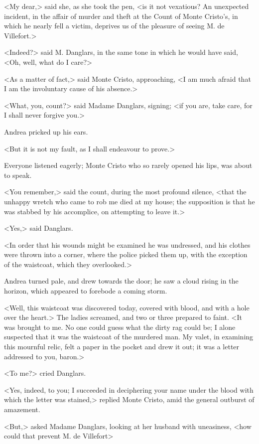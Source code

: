  <My dear,> said she, as she took the pen, <is it not vexatious? An unexpected incident, in the affair of murder and theft at the Count of Monte Cristo's, in which he nearly fell a victim, deprives us of the pleasure of seeing M. de Villefort.> 

 <Indeed?> said M. Danglars, in the same tone in which he would have said, <Oh, well, what do I care?> 

 <As a matter of fact,> said Monte Cristo, approaching, <I am much afraid that I am the involuntary cause of his absence.> 

 <What, you, count?> said Madame Danglars, signing; <if you are, take care, for I shall never forgive you.> 

 Andrea pricked up his ears. 

 <But it is not my fault, as I shall endeavour to prove.> 

 Everyone listened eagerly; Monte Cristo who so rarely opened his lips, was about to speak. 

 <You remember,> said the count, during the most profound silence, <that the unhappy wretch who came to rob me died at my house; the supposition is that he was stabbed by his accomplice, on attempting to leave it.> 

 <Yes,> said Danglars. 

 <In order that his wounds might be examined he was undressed, and his clothes were thrown into a corner, where the police picked them up, with the exception of the waistcoat, which they overlooked.> 

 Andrea turned pale, and drew towards the door; he saw a cloud rising in the horizon, which appeared to forebode a coming storm. 

 <Well, this waistcoat was discovered today, covered with blood, and with a hole over the heart.> The ladies screamed, and two or three prepared to faint. <It was brought to me. No one could guess what the dirty rag could be; I alone suspected that it was the waistcoat of the murdered man. My valet, in examining this mournful relic, felt a paper in the pocket and drew it out; it was a letter addressed to you, baron.> 

 <To me?> cried Danglars. 

 <Yes, indeed, to you; I succeeded in deciphering your name under the blood with which the letter was stained,> replied Monte Cristo, amid the general outburst of amazement. 

 <But,> asked Madame Danglars, looking at her husband with uneasiness, <how could that prevent M. de Villefort\longdash> 


